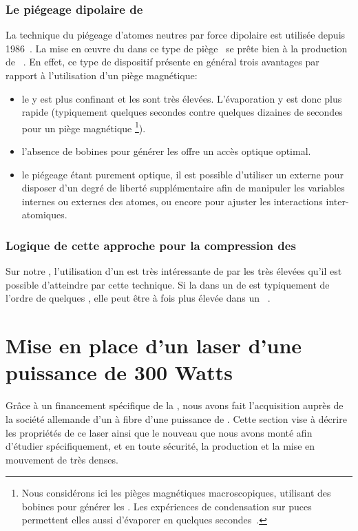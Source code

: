 \subsubsection{Le piégeage dipolaire de \natufs}
La technique du piégeage d'atomes neutres \ufs par force dipolaire est utilisée depuis 1986~\cite{CBA86}. La mise en \oe uvre du \rpef dans ce type de piège~\cite{ALD95} se prête bien à la production de \becs~\cite{BSC01,CRG03,CRG03a,WHM03,REN04}. En effet, ce type de dispositif présente en général trois avantages par rapport à l'utilisation d'un piège magnétique:
\begin{itemize}
	\item le \pp y est plus confinant et les \dats sont très élevées. L'évaporation y est donc plus rapide (typiquement quelques secondes contre quelques dizaines de secondes pour un piège magnétique%
	\footnote{Nous considérons ici les pièges magnétiques macroscopiques, \cad utilisant des bobines pour générer les \chms. Les expériences de condensation sur puces permettent elles aussi d'évaporer en quelques secondes~\cite{DSI04}.}).
	\item l'absence de bobines pour générer les \chms offre un accès optique optimal.
	\item le piégeage étant purement optique, il est possible d'utiliser un \chm externe pour disposer d'un degré de liberté supplémentaire afin de manipuler les variables internes ou externes des atomes, ou encore pour ajuster les interactions inter-atomiques.
\end{itemize}

\subsubsection{Logique de cette approche pour la compression des \pats}
Sur notre \setup, l'utilisation d'un \pd est très intéressante de par les \dats très élevées qu'il est possible d'atteindre par cette technique. 
Si la \dat dans un \pmo de \Rb est typiquement de l'ordre de quelques , elle peut être  à  fois plus élevée dans un \pd~\cite{BSC01}.



\section{Mise en place d'un laser d'une puissance de 300 Watts}

Grâce à un financement spécifique de la \dga, nous avons fait l'acquisition auprès de la société allemande  d'un \lyb à fibre d'une puissance de . 
Cette section vise à décrire les propriétés de ce laser ainsi que le nouveau \setup que nous avons monté afin d'étudier spécifiquement, et en toute sécurité, la production et la mise en mouvement de \pats très denses.

